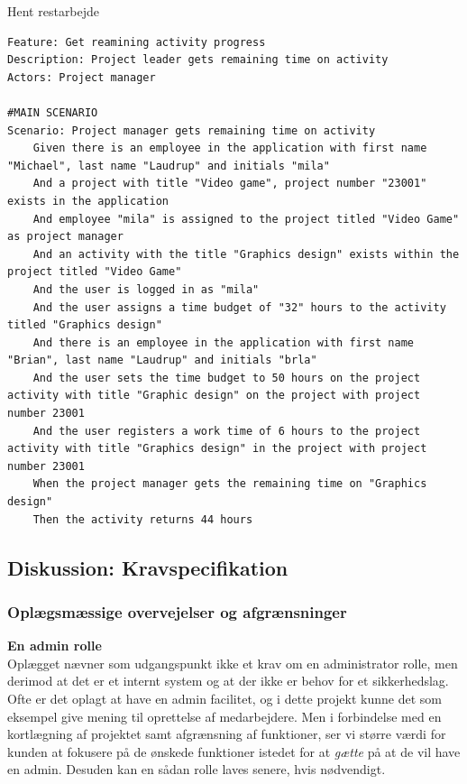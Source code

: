 \begin{listing}[H]
    \centering
    \caption{Hent restarbejde}\label{lst:remainingTime}
    \begin{verbatim}
Feature: Get reamining activity progress
Description: Project leader gets remaining time on activity
Actors: Project manager

#MAIN SCENARIO
Scenario: Project manager gets remaining time on activity
    Given there is an employee in the application with first name "Michael", last name "Laudrup" and initials "mila"
    And a project with title "Video game", project number "23001" exists in the application
    And employee "mila" is assigned to the project titled "Video Game" as project manager
    And an activity with the title "Graphics design" exists within the project titled "Video Game"
    And the user is logged in as "mila"
    And the user assigns a time budget of "32" hours to the activity titled "Graphics design"
    And there is an employee in the application with first name "Brian", last name "Laudrup" and initials "brla"
    And the user sets the time budget to 50 hours on the project activity with title "Graphic design" on the project with project number 23001
    And the user registers a work time of 6 hours to the project activity with title "Graphics design" in the project with project number 23001
    When the project manager gets the remaining time on "Graphics design"
    Then the activity returns 44 hours
    \end{verbatim}
\end{listing}

\subsection{Diskussion: Kravspecifikation}
\subsubsection{Oplægsmæssige overvejelser og afgrænsninger} 
\textbf{En admin rolle} \\
Oplægget nævner som udgangspunkt ikke et krav om en administrator rolle, men derimod at det er et internt system og at der ikke er behov for et sikkerhedslag. Ofte er det oplagt at have en admin facilitet, og i dette projekt kunne det som eksempel give mening til oprettelse af medarbejdere. Men i forbindelse med en kortlægning af projektet samt afgrænsning af funktioner, ser vi større værdi for kunden at fokusere på de ønskede funktioner istedet for at \textit{gætte} på at de vil have en admin. Desuden kan en sådan rolle laves senere, hvis nødvendigt.

